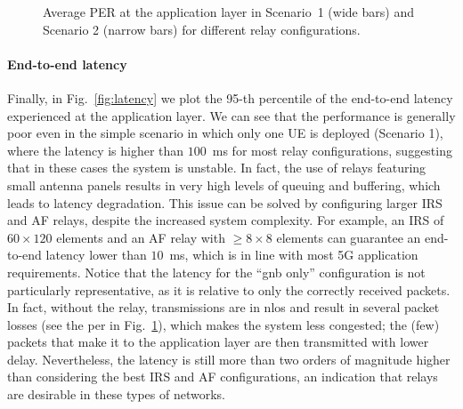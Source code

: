 \begin{figure}
	\centering
	\setlength{}
	\setlength{}
	
	\caption{Average PER at the application layer in Scenario~1 (wide bars) and Scenario 2 (narrow bars) for different relay configurations.}
	\label{fig:per}
\end{figure}

\paragraph{End-to-end latency}

Finally, in Fig.~\ref{fig:latency} we plot the 95-th percentile of the end-to-end latency experienced at the application layer.
 We can see that the performance is generally poor even in the simple scenario in which only one UE is deployed (Scenario 1), where the latency is higher than $100$~ms for most relay configurations, suggesting that in these cases the system is unstable.  In fact, the use of relays featuring small antenna panels results in very high levels of queuing and buffering, which leads to latency degradation. This issue can be solved by configuring larger IRS and AF relays, despite the increased system complexity. 
 For example, an IRS of $60\times120$ elements and an AF relay with $\geq 8\times8$ elements can guarantee an end-to-end latency lower than $10$~ms, which is in line with most 5G application requirements. 
 Notice that the latency for the ``\gls{gnb} only'' configuration is not particularly representative, as it is relative to only the correctly received packets.
 In fact, without the relay, transmissions are in \gls{nlos} and result in several packet losses (see the \gls{per} in Fig.~\ref{fig:per}), which makes the system less congested; the (few) packets that make it to the application layer are then transmitted with lower delay. Nevertheless, the latency is still more than two orders of magnitude higher than considering the best IRS and AF configurations, an indication that relays are desirable in these types of networks.


